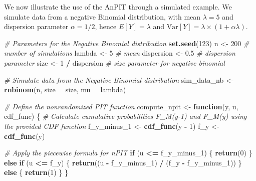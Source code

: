 \documentclass[
  letterpaper,
]{krantz}
\newenvironment{Shaded}{\begin{snugshade}}{\end{snugshade}}
\newcommand{\AttributeTok}[1]{\textcolor[rgb]{0.13,0.29,0.53}{#1}}
\newcommand{\CommentTok}[1]{\textcolor[rgb]{0.56,0.35,0.01}{\textit{#1}}}
\newcommand{\ControlFlowTok}[1]{\textcolor[rgb]{0.13,0.29,0.53}{\textbf{#1}}}
\newcommand{\DecValTok}[1]{\textcolor[rgb]{0.00,0.00,0.81}{#1}}
\newcommand{\FloatTok}[1]{\textcolor[rgb]{0.00,0.00,0.81}{#1}}
\newcommand{\FunctionTok}[1]{\textcolor[rgb]{0.13,0.29,0.53}{\textbf{#1}}}
\newcommand{\NormalTok}[1]{#1}
\newcommand{\OtherTok}[1]{\textcolor[rgb]{0.56,0.35,0.01}{#1}}
\newcommand{\SpecialCharTok}[1]{\textcolor[rgb]{0.81,0.36,0.00}{\textbf{#1}}}
\begin{document}
We now illustrate the use of the AnPIT through a simulated example. We
simulate data from a negative Binomial distribution, with mean
\(\lambda = 5\) and dispersion parameter \(\alpha = 1/2\), hence
\(E[Y] = \lambda\) and
\(\text{Var}[Y] = \lambda \times (1 + \alpha \lambda)\).

\begin{Shaded}
\begin{Highlighting}[]
\CommentTok{\# Parameters for the Negative Binomial distribution}
\FunctionTok{set.seed}\NormalTok{(}\DecValTok{123}\NormalTok{)}
\NormalTok{n }\OtherTok{\textless{}{-}} \DecValTok{200}                \CommentTok{\# number of simulations}
\NormalTok{lambda }\OtherTok{\textless{}{-}} \DecValTok{5}             \CommentTok{\# mean}
\NormalTok{dispersion }\OtherTok{\textless{}{-}} \FloatTok{0.5}       \CommentTok{\# dispersion parameter}
\NormalTok{size }\OtherTok{\textless{}{-}} \DecValTok{1} \SpecialCharTok{/}\NormalTok{ dispersion  }\CommentTok{\# size parameter for negative binomial}

\CommentTok{\# Simulate data from the Negative Binomial distribution}
\NormalTok{sim\_data\_nb }\OtherTok{\textless{}{-}} \FunctionTok{rnbinom}\NormalTok{(n, }\AttributeTok{size =}\NormalTok{ size, }\AttributeTok{mu =}\NormalTok{ lambda)}

\CommentTok{\# Define the nonrandomized PIT function}
\NormalTok{compute\_npit }\OtherTok{\textless{}{-}} \ControlFlowTok{function}\NormalTok{(y, u, cdf\_func) \{}
  \CommentTok{\# Calculate cumulative probabilities F\_M(y{-}1) and F\_M(y) using the provided CDF function}
\NormalTok{  f\_y\_minus\_1 }\OtherTok{\textless{}{-}} \FunctionTok{cdf\_func}\NormalTok{(y }\SpecialCharTok{{-}} \DecValTok{1}\NormalTok{)}
\NormalTok{  f\_y }\OtherTok{\textless{}{-}} \FunctionTok{cdf\_func}\NormalTok{(y)}
  
  \CommentTok{\# Apply the piecewise formula for nPIT}
  \ControlFlowTok{if}\NormalTok{ (u }\SpecialCharTok{\textless{}=}\NormalTok{ f\_y\_minus\_1) \{}
    \FunctionTok{return}\NormalTok{(}\DecValTok{0}\NormalTok{)}
\NormalTok{  \} }\ControlFlowTok{else} \ControlFlowTok{if}\NormalTok{ (u }\SpecialCharTok{\textless{}=}\NormalTok{ f\_y) \{}
    \FunctionTok{return}\NormalTok{((u }\SpecialCharTok{{-}}\NormalTok{ f\_y\_minus\_1) }\SpecialCharTok{/}\NormalTok{ (f\_y }\SpecialCharTok{{-}}\NormalTok{ f\_y\_minus\_1))}
\NormalTok{  \} }\ControlFlowTok{else}\NormalTok{ \{}
    \FunctionTok{return}\NormalTok{(}\DecValTok{1}\NormalTok{)}
\NormalTok{  \}}
\NormalTok{\}}


\end{Highlighting}
\end{Shaded}
\end{document}
